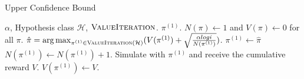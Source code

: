 \documentclass{article}
\theoremstyle{definition}
\DeclareMathOperator*{\argmax}{arg\,max}
\begin{document}
    \begin{algorithm}
        \caption{Upper Confidence Bound}
        \label{UCB}

        \begin{algorithmic}[1]
            \Require $ \alpha $, Hypothesis class $ \mathcal{H} $, $ \textsc{ValueIteration} $.
            \Ensure  $ \pi^{(1)} $. 
            \State $ N(\pi) \leftarrow 1 $ and $ V(\pi) \leftarrow 0 $  for all $ \pi $.
                \State  $ \hat{\pi} = \argmax_{\pi^{(1)}\in \textsc{ValueIteration}(\mathcal{H})} ( V(\pi^{(1)} )+ \sqrt{\frac{\alpha log i}{N(\pi^{(1)})}}) $. 
                \State $ \pi^{(1)} \leftarrow \hat{\pi} $
                \State  $ N(\pi^{(1)}) \leftarrow N(\pi^{(1)}) + 1  $. 
                \State Simulate with $  \pi^{(1)}  $ and receive the cumulative reward $ V $.  
                \State $ V(\pi^{(1)}) \leftarrow V $.
            \EndFor
        \end{algorithmic}
    \end{algorithm}
\end{document}
